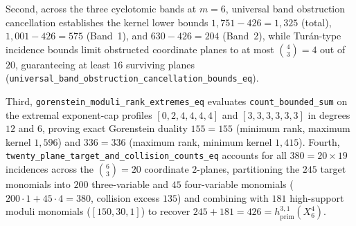 \documentclass[11pt,a4paper]{article}
\begin{document}
Second, across the three cyclotomic bands at $m = 6$, universal band obstruction cancellation establishes the kernel lower bounds $1{,}751 - 426 = 1{,}325$ (total), $1{,}001 - 426 = 575$ (Band~1), and $630 - 426 = 204$ (Band~2), while Tur\'an-type incidence bounds limit obstructed coordinate planes to at most $\binom{4}{3} = 4$ out of $20$, guaranteeing at least $16$ surviving planes (\texttt{universal\_band\_obstruction\_cancellation\_bounds\_eq}).

Third, \texttt{gorenstein\_moduli\_rank\_extremes\_eq} evaluates \texttt{count\_bounded\_sum} on the extremal exponent-cap profiles $[0, 2, 4, 4, 4, 4]$ and $[3, 3, 3, 3, 3, 3]$ in degrees $12$ and $6$, proving exact Gorenstein duality $155 = 155$ (minimum rank, maximum kernel $1{,}596$) and $336 = 336$ (maximum rank, minimum kernel $1{,}415$). Fourth, \texttt{twenty\_plane\_target\_and\_collision\_counts\_eq} accounts for all $380 = 20 \times 19$ incidences across the $\binom{6}{3} = 20$ coordinate $2$-planes, partitioning the $245$ target monomials into $200$ three-variable and $45$ four-variable monomials ($200 \cdot 1 + 45 \cdot 4 = 380$, collision excess $135$) and combining with $181$ high-support moduli monomials ($[150, 30, 1]$) to recover $245 + 181 = 426 = h^{3,1}_{\mathrm{prim}}(X_6^4)$.
\end{document}
